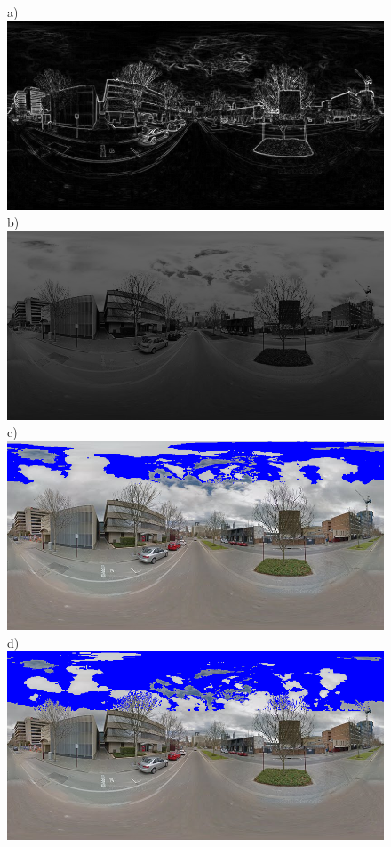 \documentclass[final,3p,times,authoryear]{elsarticle}
\begin{document}
	

\begin{figure}
\centering    
a)\includegraphics[scale=0.20]{Images/panorama-ESuX4xmQ_fDc50NK6CnfZQ-1_Sobel.png} 
b)\includegraphics[scale=0.20]{Images/panorama-ESuX4xmQ_fDc50NK6CnfZQ-1_Sobel_prob.png} 
c)\includegraphics[scale=0.20]{Images/panorama-ESuX4xmQ_fDc50NK6CnfZQ-1_Sobel_95_marked.png} 
d)\includegraphics[scale=0.20]{Images/panorama-ESuX4xmQ_fDc50NK6CnfZQ-1_Sobel_90_marked.png} 

\end{figure}
\end{document}
